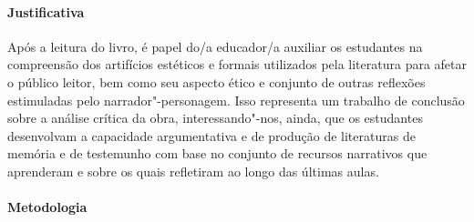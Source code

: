 \documentclass[11pt]{extarticle}
\begin{document}
\paragraph{Justificativa} Após a leitura do livro, é papel do/a educador/a
auxiliar os estudantes na compreensão dos artifícios estéticos e formais
utilizados pela literatura para afetar o público leitor, bem como seu
aspecto ético e conjunto de outras reflexões estimuladas pelo
narrador"-personagem. Isso representa um trabalho de conclusão sobre a
análise crítica da obra, interessando"-nos, ainda, que os estudantes
desenvolvam a capacidade argumentativa e de produção de literaturas de
memória e de testemunho com base no conjunto de recursos narrativos que
aprenderam e sobre os quais refletiram ao longo das últimas aulas.


\paragraph{Metodologia} 
\end{document}
